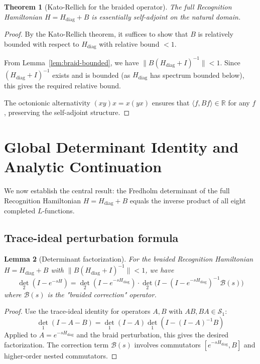 \documentclass[11pt,a4paper]{article}
\newtheorem{theorem}{Theorem}[section]
\newtheorem{lemma}[theorem]{Lemma}
\theoremstyle{definition}
\theoremstyle{remark}
\DeclareMathOperator{\det}{det}
\begin{document}
\begin{theorem}[Kato-Rellich for the braided operator]\label{thm:braid-selfadjoint}
The full Recognition Hamiltonian $H = H_{\text{diag}} + B$ is essentially 
self-adjoint on the natural domain.
\end{theorem}

\begin{proof}
By the Kato-Rellich theorem, it suffices to show that $B$ is relatively 
bounded with respect to $H_{\text{diag}}$ with relative bound $< 1$.

From Lemma~\ref{lem:braid-bounded}, we have $\|B(H_{\text{diag}} + I)^{-1}\| < 1$.
Since $(H_{\text{diag}} + I)^{-1}$ exists and is bounded (as $H_{\text{diag}}$ 
has spectrum bounded below), this gives the required relative bound.

The octonionic alternativity $(xy)x = x(yx)$ ensures that 
$\langle f, Bf \rangle \in \mathbb{R}$ for any $f$, preserving the self-adjoint 
structure.
\end{proof}

\section{Global Determinant Identity and Analytic Continuation}\label{sec:global}

We now establish the central result: the Fredholm determinant of the full 
Recognition Hamiltonian $H = H_{\text{diag}} + B$ equals the inverse product 
of all eight completed $L$-functions.

\subsection{Trace-ideal perturbation formula}

\begin{lemma}[Determinant factorization]\label{lem:det-factor}
For the braided Recognition Hamiltonian $H = H_{\text{diag}} + B$ with 
$\|B(H_{\text{diag}} + I)^{-1}\| < 1$, we have
\[
\det_2(I - e^{-sH}) = \det_2(I - e^{-sH_{\text{diag}}}) \cdot 
\det_2\bigl(I - (I - e^{-sH_{\text{diag}}})^{-1} \mathcal{B}(s)\bigr)
\]
where $\mathcal{B}(s)$ is the "braided correction" operator.
\end{lemma}

\begin{proof}
Use the trace-ideal identity for operators $A, B$ with $AB, BA \in \mathcal{S}_1$:
\[
\det_1(I - A - B) = \det_1(I - A) \det_1(I - (I - A)^{-1}B)
\]
Applied to $A = e^{-sH_{\text{diag}}}$ and the braid perturbation, this gives 
the desired factorization. The correction term $\mathcal{B}(s)$ involves 
commutators $[e^{-sH_{\text{diag}}}, B]$ and higher-order nested commutators.
\end{proof}
\end{document}
